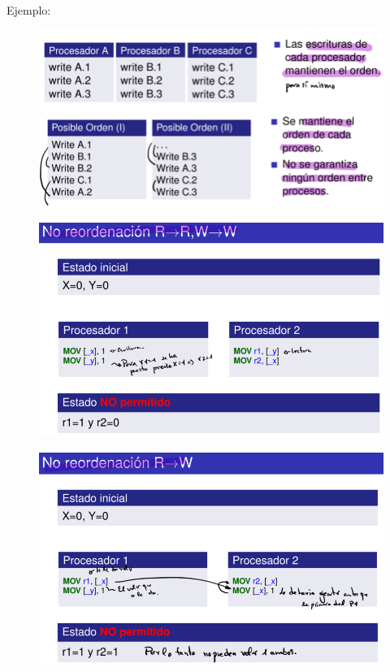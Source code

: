 \documentclass[12pt, twoside, openright]{report} %
\begin{document}
    Ejemplo:
    \begin{figure}[H]
      {\includegraphics[scale=.5]{Untitled 61.png}}
    \end{figure}
    \begin{figure}[H]
      {\includegraphics[scale=.5]{Untitled 62.png}}
    \end{figure}
    \begin{figure}[H]
      {\includegraphics[scale=.5]{Untitled 63.png}}
    \end{figure}
\end{document}

